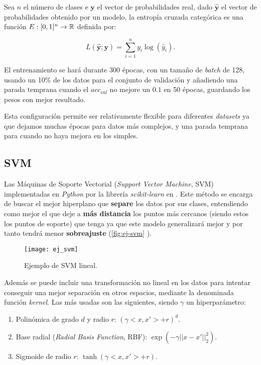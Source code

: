 \begin{definicion}
  Sea $n$ el número de clases e $\textbf{y}$ el vector de probabilidades real, dado $\hat{\textbf{y}}$ el vector de probabilidades obtenido por un modelo, la entropía cruzada categórica es una función $E : [0, 1]^n \to \mathbb{R}$ definida por:

  $$ L(\hat{\textbf{y}} ; \textbf{y}) = \sum \limits^n_{i = 1} y_i \log(\hat{y}_i).$$
  \label{def:crossentropy}
\end{definicion}

El entrenamiento se hará durante 300 épocas, con un tamaño de \emph{batch} de 128, usando un 10\% de los datos para el conjunto de validación y añadiendo una parada temprana cuando el $acc_{val}$ no mejore un $0.1$ en 50 épocas, guardando los pesos con mejor resultado.

Esta configuración permite ser relativamente flexible para diferentes \emph{datasets} ya que dejamos muchas épocas para datos más complejos, y una parada temprana para cuando no haya mejora en los simples.

\subsection{SVM}

Las Máquinas de Soporte Vectorial (\emph{Support Vector Machine}, SVM) \cite{cortes1995support} implementadas en \emph{Python} por la librería \emph{scikit-learn} en \cite{scikit2020svm}. Este método se encarga de buscar el mejor hiperplano que \textbf{separe} los datos por sus clases, entendiendo como mejor el que deje a \textbf{más distancia} los puntos más cercanos (siendo estos los puntos de soporte) que tenga ya que este modelo generalizará mejor y por tanto tendrá menor \textbf{sobreajuste} (\autoref{fig:ej-svm} \cite{JavaTpointSVM}).

\begin{figure}[htbp]
  \centering
  \texttt{[image: ej\_svm]}
  \caption{Ejemplo de SVM lineal.}
  \label{fig:ej-svm}
\end{figure}

Además se puede incluir una transformación no lineal en los datos para intentar conseguir una mejor separación en otros espacios, mediante la denominada función \emph{kernel}. Las más usadas son las siguientes, siendo $\gamma$ un hiperparámetro:

  \begin{enumerate}
    \item Polinómica de grado $d$ y radio $r$: $(\gamma<x, x'> + r)^d$.
    \item Base radial (\emph{Radial Basis Function}, RBF): $\exp(-\gamma||x - x'||^2_2)$.
    \item Sigmoide de radio $r$: $\tanh(\gamma<x, x'> + r)$.
  \end{enumerate}

